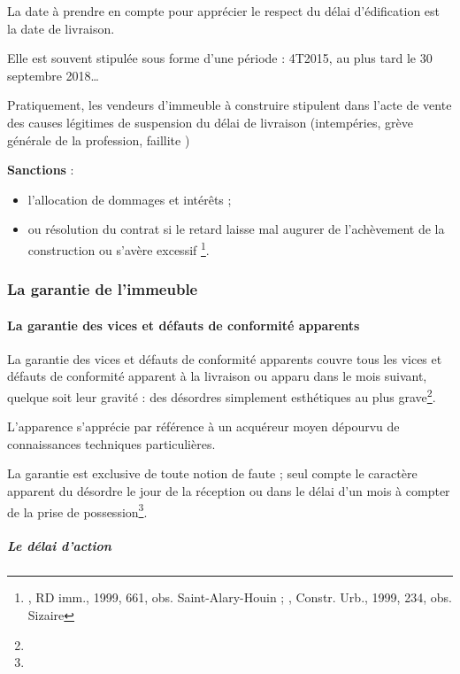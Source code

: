 				La date à prendre en compte pour apprécier le respect du délai d’édification est la date de livraison.

				Elle est souvent stipulée sous forme d’une période : 4T2015, au plus tard le 30 septembre 2018…

				Pratiquement, les vendeurs d’immeuble à construire stipulent dans l’acte de vente des causes légitimes de suspension du délai de livraison (intempéries, grève générale de la profession, faillite \etc)

				\textbf{Sanctions} :
				\begin{itemize}
					\item l’allocation de dommages et intérêts ;
					\item ou résolution du contrat si le retard laisse mal augurer de l’achèvement de la construction ou s’avère excessif \footnote{, RD imm., 1999, 661, obs. Saint-Alary-Houin ; , Constr. Urb., 1999, 234, obs. Sizaire}.
				\end{itemize}


		\subsubsection{La garantie de l'immeuble}

			\paragraph{La garantie des vices et défauts de conformité apparents}

				La garantie des vices et défauts de conformité apparents couvre tous les vices et défauts de conformité apparent à la livraison ou apparu dans le mois suivant, quelque soit leur gravité : des désordres simplement esthétiques au plus grave\footnote{}.

				L’apparence s’apprécie par référence à un acquéreur moyen dépourvu de connaissances techniques particulières.

				La garantie est exclusive de toute notion de faute ; seul compte le caractère apparent du désordre le jour de la réception ou dans le délai d’un mois à compter de la prise de possession\footnote{}.

				\subparagraph{Le délai d’action}

